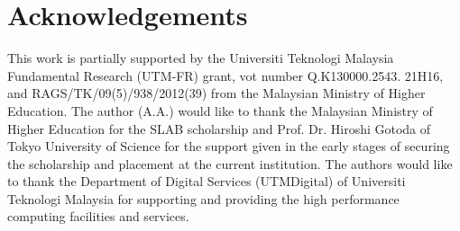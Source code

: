 \documentclass[a4paper,fleqn]{cas-sc}
\begin{document}
%
%
\section*{Acknowledgements}
This work is partially supported by the Universiti Teknologi Malaysia Fundamental Research (UTM-FR) grant, vot number Q.K130000.2543.
21H16, and RAGS/TK/09(5)/938/2012(39) from the Malaysian Ministry of Higher Education. The author (A.A.) would like to thank the Malaysian Ministry of Higher Education for the SLAB scholarship and Prof. Dr. Hiroshi Gotoda of Tokyo University of Science for the support given in the early stages of securing the scholarship and placement at the current institution. The authors would like to thank the Department of Digital Services (UTMDigital) of Universiti Teknologi Malaysia for supporting and providing the high performance computing facilities and services.
 
\printcredits

%






%
%
\end{document}
